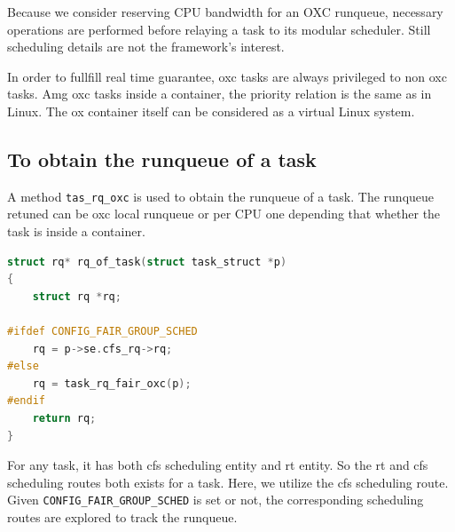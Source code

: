 Because we consider reserving CPU bandwidth for an OXC runqueue, necessary
operations are performed before relaying a task to its modular scheduler.
Still scheduling details are not the framework's interest. 

In order to fullfill real time guarantee, oxc tasks are always privileged
to non oxc tasks. Amg oxc tasks inside a container, the priority relation
is the same as in Linux. The ox container itself can be considered as a 
virtual Linux system.

\subsection{To obtain the runqueue of a task}
A method \texttt{tas\_rq\_oxc} is used to obtain the runqueue of a task.
The runqueue retuned can be oxc local runqueue or per CPU one depending
that whether the task is inside a container.
\begin{lstlisting}[language=C]
struct rq* rq_of_task(struct task_struct *p)
{
	struct rq *rq;

#ifdef CONFIG_FAIR_GROUP_SCHED
	rq = p->se.cfs_rq->rq;
#else
	rq = task_rq_fair_oxc(p);
#endif
	return rq;
}
\end{lstlisting}
For any task, it has both cfs scheduling entity and rt entity. So the
rt and cfs scheduling routes both exists for a task. Here, we utilize
the cfs scheduling route. Given \texttt{CONFIG\_FAIR\_GROUP\_SCHED}
is set or not, the corresponding scheduling routes are explored to
track the runqueue.

